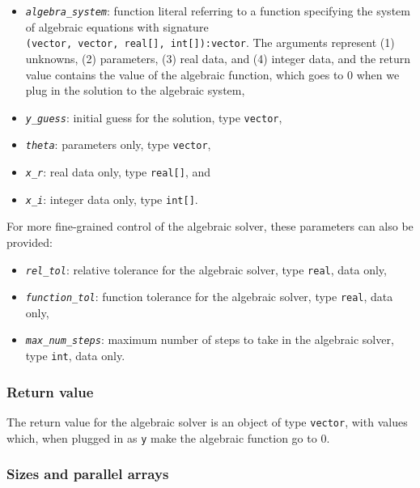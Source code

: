 \documentclass[
  10pt,
]{book}
\begin{document}
\begin{itemize}
\item
  \emph{\texttt{algebra\_system}}: function literal referring to a function
  specifying the system of algebraic equations with signature
  \texttt{(vector,\ vector,\ real{[}{]},\ int{[}{]}):vector}. The arguments represent (1)
  unknowns, (2) parameters, (3) real data, and (4) integer data,
  and the return value contains the value of the algebraic function,
  which goes to 0 when we plug in the solution to the algebraic system,
\item
  \emph{\texttt{y\_guess}}: initial guess for the solution, type \texttt{vector},
\item
  \emph{\texttt{theta}}: parameters only, type \texttt{vector},
\item
  \emph{\texttt{x\_r}}: real data only, type \texttt{real{[}{]}}, and
\item
  \emph{\texttt{x\_i}}: integer data only, type \texttt{int{[}{]}}.
\end{itemize}

For more fine-grained control of the algebraic solver, these
parameters can also be provided:

\begin{itemize}
\item
  \emph{\texttt{rel\_tol}}: relative tolerance for the algebraic solver, type
  \texttt{real}, data only,
\item
  \emph{\texttt{function\_tol}}: function tolerance for the algebraic solver,
  type \texttt{real}, data only,
\item
  \emph{\texttt{max\_num\_steps}}: maximum number of steps to take in the
  algebraic solver, type \texttt{int}, data only.
\end{itemize}

\hypertarget{return-value}{%
\subsubsection{Return value}\label{return-value}}

The return value for the algebraic solver is an object of type
\texttt{vector}, with values which, when plugged in as \texttt{y} make the algebraic
function go to 0.

\hypertarget{sizes-and-parallel-arrays}{%
\subsubsection{Sizes and parallel arrays}\label{sizes-and-parallel-arrays}}
\end{document}
